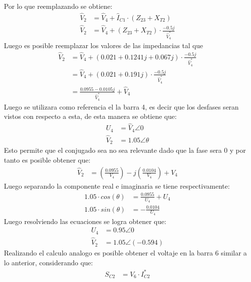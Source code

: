 \documentclass[
  11pt,
  letterpaper,
   addpoints,
   answers
  ]{exam}
\begin{document}
\begin{questions}
\begin{solution}
        Por lo que reemplazando se obtiene:
        \begin{align}
            \hat{V}_{2} &= \hat{V}_{4} + \hat{I}_{C1} \cdot (Z_{23} + X_{T2})\\
            \hat{V}_{2} &= \hat{V}_{4} + (Z_{23} + X_{T2})\cdot \frac{-0.5j}{\hat{V}^{*}_{4}}
        \end{align}
        Luego es posible reemplazar los valores de las impedancias tal que 
        \begin{align}
            \hat{V}_{2} &= \hat{V}_{4} + (0.021+0.1241j + 0.067j)\cdot \frac{-0.5j}{\hat{V}^{*}_{4}}\\
            &=\hat{V}_{4} + (0.021+0.191j)\cdot \frac{-0.5j}{\hat{V}^{*}_{4}}\\
            &= \frac{0.0955-0.0105j}{\hat{V}^{*}_{4}} + \hat{V}_{4}
        \end{align}
        Luego se utilizara como referencia el la barra 4, es decir que los desfases seran vistos con respecto a esta, de esta manera se obtiene que:
        \begin{align}
            U_{4} &= \hat{V}_{4}\angle 0\\
            \hat{V}_{2} &= 1.05 \angle \theta
        \end{align}
        Esto permite que el conjugado sea no sea relevante dado que la fase sera 0 y por tanto es posible obtener que:
        \begin{align}
            \hat{V}_{2} &= \left(\frac{0.0955}{V_{4}}\right) - j\left(\frac{0.0104}{V_{4}}\right) + V_{4}
        \end{align}        
        Luego separando la componente real e imaginaria se tiene respectivamente:
        \begin{align}
            1.05 \cdot cos(\theta) &= \frac{0.0955}{U_{4}} + U_{4}\\
            1.05 \cdot sin(\theta) &= -\frac{0.0104}{U_{4}}
        \end{align}
        Luego resolviendo las ecuaciones se logra obtener que:
        \begin{align}
            U_{4} &= 0.95 \angle 0\\
            \hat{V}_{2} &= 1.05 \angle (-0.594)
        \end{align}
        Realizando el calculo analogo es posible obtener el voltaje en la barra 6 similar a lo anterior, considerando que:
        \begin{align}
            S_{C2} &= \hat{V}_{6} \cdot I_{C2}^{*}  
        \end{align}

\end{solution}
\end{questions}
\end{document}
